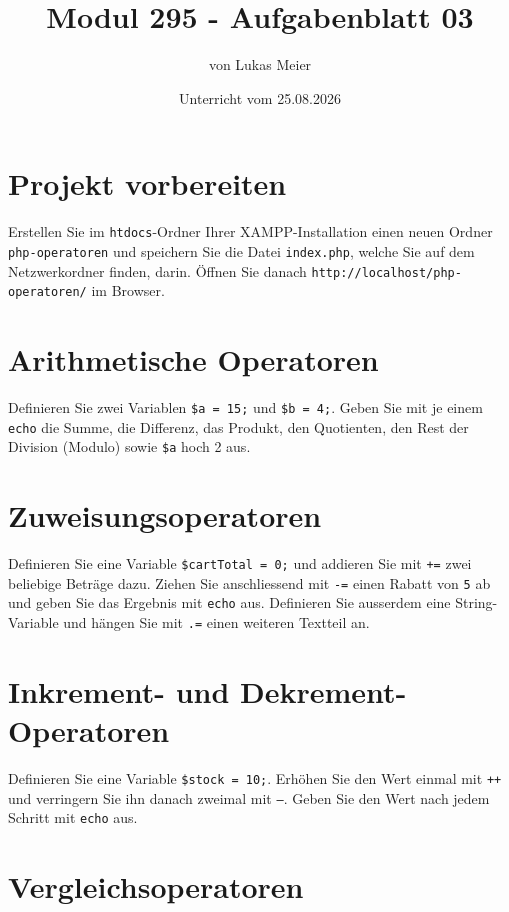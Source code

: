 \documentclass[a4paper,12pt]{article}
\title{Modul 295 - Aufgabenblatt 03}
\author{von Lukas Meier}
\date{Unterricht vom 25.08.2026}
\begin{document}
\maketitle

\section{Projekt vorbereiten}

Erstellen Sie im \texttt{htdocs}-Ordner Ihrer XAMPP-Installation einen neuen Ordner \texttt{php-operatoren} und speichern Sie die Datei \texttt{index.php}, welche Sie auf dem Netzwerkordner finden, darin. Öffnen Sie danach \texttt{http://localhost/php-operatoren/} im Browser.

\section{Arithmetische Operatoren}

Definieren Sie zwei Variablen \texttt{\$a = 15;} und \texttt{\$b = 4;}. Geben Sie mit je einem \texttt{echo} die Summe, die Differenz, das Produkt, den Quotienten, den Rest der Division (Modulo) sowie \texttt{\$a} hoch 2 aus.

\section{Zuweisungsoperatoren}

Definieren Sie eine Variable \texttt{\$cartTotal = 0;} und addieren Sie mit \texttt{+=} zwei beliebige Beträge dazu. Ziehen Sie anschliessend mit \texttt{-=} einen Rabatt von \texttt{5} ab und geben Sie das Ergebnis mit \texttt{echo} aus. Definieren Sie ausserdem eine String-Variable und hängen Sie mit \texttt{.=} einen weiteren Textteil an.

\section{Inkrement- und Dekrement-Operatoren}

Definieren Sie eine Variable \texttt{\$stock = 10;}. Erhöhen Sie den Wert einmal mit \texttt{++} und verringern Sie ihn danach zweimal mit \texttt{--}. Geben Sie den Wert nach jedem Schritt mit \texttt{echo} aus.

\section{Vergleichsoperatoren}
\end{document}
